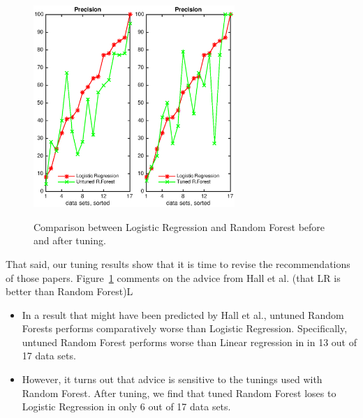 \documentclass[final,twocolumn,5p]{elsarticle}
\newcommand{\bi}{\begin{itemize}[leftmargin=0.4cm]}
\newcommand{\ei}{\end{itemize}}
\newcommand{\fig}[1]{Figure~\ref{fig:#1}}
\begin{document}
\begin{figure}[!t]
\includegraphics[width=1.5in]{./eps/LR_untuned.eps}\includegraphics[width=1.5in]{./eps/LR_tuned.eps}
\caption{Comparison between Logistic Regression and Random Forest before and after tuning. }\label{fig:lr}
 \end{figure}
 
 
That said, our tuning results show that it is time to revise
the recommendations of those papers. 
  \fig{lr} comments on the advice from Hall et al. (that LR is better than Random Forest)L
  \bi
  \item
 In a result that might have been predicted by Hall et al.,  
 untuned Random
Forests performs comparatively worse than
 Logistic Regression. Specifically, untuned
 Random Forest performs worse than Linear regression in in 13 out of   17 data sets. 
\item
However, it turns out that advice is sensitive to the tunings
used with Random Forest. After tuning, we find that tuned Random Forest
loses to Logistic Regression in only 6 out of 17 data sets. 
\ei
\end{document}
